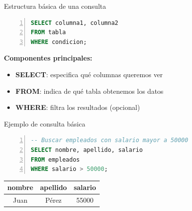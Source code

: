 \documentclass{beamer}
\begin{document}
\begin{frame}[fragile]{Estructura básica de una consulta}
    \begin{lstlisting}[language=SQL, numbers=left, numbersep=5pt]
SELECT columna1, columna2
FROM tabla
WHERE condicion;
    \end{lstlisting}
    
    \vspace{0.5cm}
    
    \textbf{Componentes principales:}
    \begin{itemize}
        \item[{\makebox[1em][c]{\textcolor{black}{\faEye}}}] \textbf{SELECT}: especifica qué columnas queremos ver
        \item[{\makebox[1em][c]{\textcolor{black}{\faTable}}}] \textbf{FROM}: indica de qué tabla obtenemos los datos
        \item[{\makebox[1em][c]{\textcolor{black}{\faFilter}}}] \textbf{WHERE}: filtra los resultados (opcional)
    \end{itemize}
\end{frame}

\begin{frame}[fragile]{Ejemplo de consulta básica}
    \begin{lstlisting}[language=SQL, numbers=left, numbersep=5pt]
-- Buscar empleados con salario mayor a 50000
SELECT nombre, apellido, salario
FROM empleados
WHERE salario > 50000;
    \end{lstlisting}
    
    \vspace{0.3cm}
    
    \begin{center}
        \begin{tabular}{ccc}
            \toprule
            nombre & apellido & salario \\
            \midrule
            Juan & Pérez & 55000 \\
            \bottomrule
        \end{tabular}
    \end{center}
\end{frame}
\end{document}
